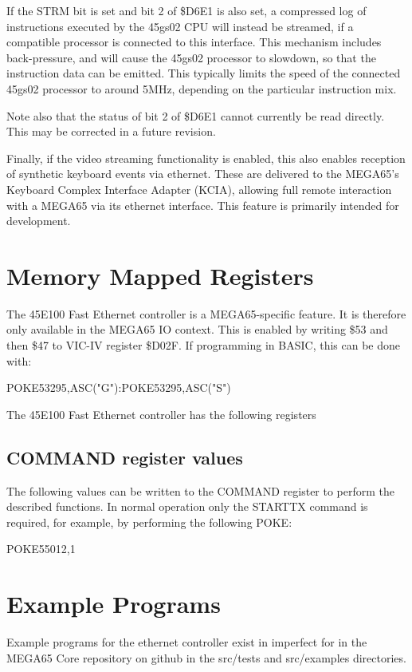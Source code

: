If the STRM bit is set and bit 2 of \$D6E1 is also set, a compressed log of instructions executed by
the 45gs02 CPU will instead be streamed, if a compatible processor is connected to this interface.
This mechanism includes back-pressure, and will cause the 45gs02 processor to slowdown,
so that the instruction data can be emitted.  This typically limits the speed of the connected
45gs02 processor to around 5MHz, depending on the particular instruction mix.

Note also that
the status of bit 2 of \$D6E1 cannot currently be read directly. This may be corrected in a future
revision.

Finally, if the video streaming functionality is enabled, this also enables reception of synthetic
keyboard events via ethernet.  These are delivered to the MEGA65's Keyboard Complex Interface Adapter
(KCIA), allowing full remote interaction with a MEGA65 via its ethernet interface.  This feature is
primarily intended for development.

\section{Memory Mapped Registers}

The 45E100 Fast Ethernet controller is a MEGA65-specific feature.
It is therefore only available in the MEGA65 IO context.
This is enabled by writing \$53 and then \$47 to VIC-IV register \$D02F.
If programming in BASIC, this can be done with:

\begin{screenoutput}
POKE53295,ASC("G"):POKE53295,ASC("S")
\end{screenoutput}

The 45E100 Fast Ethernet controller has the following registers



\subsection{COMMAND register values}

The following values can be written to the COMMAND register to perform the described functions.
In normal operation only the STARTTX command is required, for example, by performing the following POKE:

\begin{screenoutput}
POKE55012,1
\end{screenoutput}



\section{Example Programs}

Example programs for the ethernet controller exist in imperfect for in the MEGA65 Core repository on github in the src/tests and src/examples directories.
